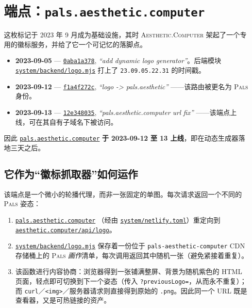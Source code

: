 \documentclass[10pt,letterpaper,twocolumn]{article}
\newcommand{\ac}{\textsc{Aesthetic}{\color{acpink}.}\textsc{Computer}}
\newcommand{\pals}{\textsc{Pals}}
\newcommand{\commit}[2]{\href{https://github.com/whistlegraph/aesthetic-computer/commit/#1}{\texttt{#1}}, \emph{``#2''}}
\newcommand{\repofile}[1]{\href{https://github.com/whistlegraph/aesthetic-computer/blob/main/#1}{\texttt{#1}}}
\begin{document}
\section{端点：\texttt{pals.aesthetic.computer}}

这枚标记于 2023 年 9 月成为基础设施，其时 \ac{} 架起了一个专用的徽标服务，并给了它一个可记忆的落脚点。

\begin{itemize}
  \item \textbf{2023-09-05} --- \commit{0aba1a378}{add dynamic logo
        generator}。后端模块 \repofile{system/backend/logo.mjs}
        打上了 \texttt{23.09.05.22.31} 的时间戳。
  \item \textbf{2023-09-12} --- \commit{f1a4f272c}{logo -> pals.aesthetic}
        ——该路由被更名为 \pals{} 身份。
  \item \textbf{2023-09-13} --- \commit{12e348035}{pals.aesthetic.computer
        url fix} ——该端点上线，可在其自有子域名下被访问。
\end{itemize}

\noindent 因此 \href{https://pals.aesthetic.computer}{\texttt{pals.aesthetic.computer}}
\textbf{于 2023-09-12 至 13 上线}，即在动态生成器落地三天之后。

\subsection{它作为“徽标抓取器”如何运作}

该端点是一个微小的轮播代理，而非一张固定的单图。每次请求返回一个不同的 \pals{} 姿态：

\begin{enumerate}
  \item \href{https://pals.aesthetic.computer}{\texttt{pals.aesthetic.computer}}
        （经由 \repofile{system/netlify.toml}）重定向到
        \href{https://aesthetic.computer/api/logo}{\texttt{aesthetic.computer/api/logo}}。
  \item \repofile{system/backend/logo.mjs} 保存着一份位于
        \texttt{pals-aesthetic-computer} CDN 存储桶上的 \pals{}
        \emph{画作}清单，每次调用返回其中随机一张（避免紧接着重复）。
  \item 该函数进行内容协商：浏览器得到一张铺满整屏、背景为随机紫色的
        HTML 页面，轻点即可切换到下一个姿态（传入
        \texttt{?previousLogo=}，从而永不重复）；而
        \texttt{curl}／\texttt{<img>}／服务器请求则直接得到原始的
        \texttt{.png}。因此同一个 URL 既是查看器，又是可热链接的资产。
\end{enumerate}
\end{document}
